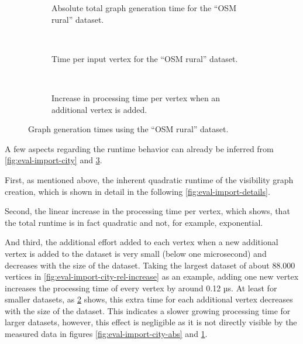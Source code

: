 \begin{figure}[h!]
\begin{minipage}{.48\textwidth}
\begin{subfigure}[t]{\linewidth}
\begin{figcenter}
						
					\end{figcenter}
					\caption{Absolute total graph generation time for the \enquote{OSM rural} dataset.}
					\label{fig:eval-import-rural-abs}
				\end{subfigure}
				\\[3ex]
				\begin{subfigure}[t]{\linewidth}
					\begin{figcenter}
						
					\end{figcenter}
					\caption{Time per input vertex for the \enquote{OSM rural} dataset.}
				\end{subfigure}
				\\[3ex]
				\begin{subfigure}[t]{\linewidth}
					\begin{figcenter}
						
					\end{figcenter}
					\caption{Increase in processing time per vertex when an additional vertex is added.}
					\label{fig:eval-import-rural-rel-increase}
				\end{subfigure}
				\caption{Graph generation times using the \enquote{OSM rural} dataset.}
				\label{fig:eval-import-rural}
			\end{minipage}
		\end{figure}
		
		A few aspects regarding the runtime behavior can already be inferred from \cref{fig:eval-import-city} and \cref{fig:eval-import-rural}.
		
		First, as mentioned above, the inherent quadratic runtime of the visibility graph creation, which is shown in detail in the following \cref{fig:eval-import-details}.
		
		Second, the linear increase in the processing time per vertex, which shows, that the total runtime is in fact quadratic and not, for example, exponential.
		
		And third, the additional effort added to each vertex when a new additional vertex is added to the dataset is very small (below one microsecond) and decreases with the size of the dataset.
		Taking the largest dataset of about 88.000 vertices in \cref{fig:eval-import-city-rel-increase} as an example, adding one new vertex increases the processing time of every vertex by around 0.12 µs.
		At least for smaller datasets, as \cref{fig:eval-import-rural-rel-increase} shows, this extra time for each additional vertex decreases with the size of the dataset.
		This indicates a slower growing processing time for larger datasets, however, this effect is negligible as it is not directly visible by the measured data in figures \ref{fig:eval-import-city-abs} and \ref{fig:eval-import-rural-abs}.
		
